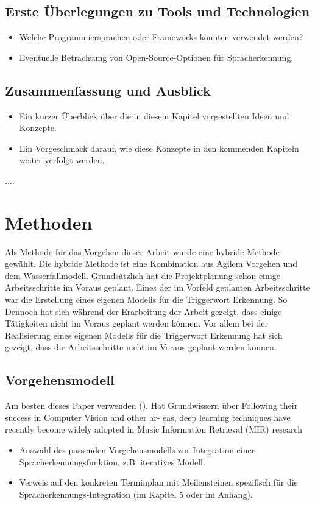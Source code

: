 \documentclass[11pt,a4paper]{article}
\begin{document}
\subsection{Erste Überlegungen zu Tools und Technologien}
\begin{itemize}
	\item Welche Programmiersprachen oder Frameworks könnten verwendet werden?
	\item Eventuelle Betrachtung von Open-Source-Optionen für Spracherkennung.
\end{itemize}

\subsection{Zusammenfassung und Ausblick}
\begin{itemize}
	\item Ein kurzer Überblick über die in diesem Kapitel vorgestellten Ideen und Konzepte.
	\item Ein Vorgeschmack darauf, wie diese Konzepte in den kommenden Kapiteln weiter verfolgt werden.
\end{itemize}


....

\newpage \section{Methoden}
Als Methode für das Vorgehen dieser Arbeit wurde eine hybride Methode gewählt. Die hybride Methode
ist eine Kombination aus Agilem Vorgehen und dem Wasserfallmodell. Grundsätzlich hat die 
Projektplanung schon einige Arbeitsschritte im Voraus geplant. Eines der im Vorfeld geplanten 
Arbeitsschritte war die Erstellung eines eigenen Modells für die Triggerwort Erkennung. So
Dennoch hat sich während der 
Erarbeitung der Arbeit gezeigt, dass einige Tätigkeiten nicht im Voraus geplant werden können.
Vor allem bei der Realisierung eines eigenen Modells für die Triggerwort Erkennung hat sich
gezeigt, dass die Arbeitsschritte nicht im Voraus geplant werden können.

\subsection{Vorgehensmodell}
Am besten dieses Paper verwenden (\cite{choi2018tutorial}). Hat Grundwissern über 
Following their success in Computer Vision and other ar- eas, deep learning techniques have 
recently become widely adopted in Music Information Retrieval (MIR) research
\begin{itemize}
	\item Auswahl des passenden Vorgehensmodells zur Integration einer Spracherkennungsfunktion, z.B. iteratives Modell.
	\item Verweis auf den konkreten Terminplan mit Meilensteinen spezifisch für die Spracherkennungs-Integration (im Kapitel 5 oder im Anhang).
\end{itemize}
\end{document}
